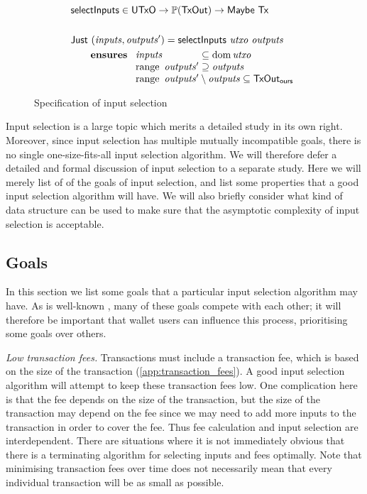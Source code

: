 \documentclass{article}
\DeclareMathOperator{\dom}{dom}
\DeclareMathOperator{\range}{range}
\theoremstyle{definition}{
  \newtheorem{lemma}{Lemma}[section] %
  \newtheorem{definition}[lemma]{Definition}
}
\theoremstyle{theorem}{
  \newtheorem{invariant}[lemma]{Invariant}
  \newtheorem{proofobligation}[lemma]{Proof Obligation}
}
\numberwithin{equation}{lemma}
\begin{document}
\begin{figure}[b]
\begin{align*}
& \mathsf{selectInputs} \in \mathsf{UTxO} \to \mathbb{P}(\mathsf{TxOut}) \to \mathsf{Maybe} ~ \mathsf{Tx} \\
\\
& \mathsf{Just} ~ (\mathit{inputs}, \mathit{outputs}') = \mathsf{selectInputs} ~ \mathit{utxo} ~ \mathit{outputs} \\
& \qquad \mathbf{ensures~}
\begin{array}[t]{l@{\;}l@{\;}l}
\mathit{inputs}          & \subseteq & \dom \mathit{utxo} \\
\range ~ \mathit{outputs}' & \supseteq & \mathit{outputs}   \\
\multicolumn{3}{l}{\range ~ \mathit{outputs}' \setminus \mathit{outputs} \subseteq \mathsf{TxOut_{ours}}} \\
\end{array}
\end{align*}
\caption{\label{fig:input_selection_sig}Specification of input selection}
\end{figure}

Input selection is a large topic which merits a detailed study in its own right.
Moreover, since input selection has multiple mutually incompatible goals, there
is no single one-size-fits-all input selection algorithm.  We will therefore
defer a detailed and formal discussion of input selection to a separate study.
Here we will merely list of of the goals of input selection, and list some
properties that a good input selection algorithm will have. We will also
briefly consider what kind of data structure can be used to make sure that
the asymptotic complexity of input selection is acceptable.

\subsection{Goals}

In this section we list some goals that a particular input selection algorithm
may have. As is well-known \citep{lopp:challenges}, many of these goals compete
with each other; it will therefore be important that wallet users can influence
this process, prioritising some goals over others.

\emph{Low transaction fees.}
Transactions must include a transaction fee, which is based on the size of the
transaction (\cref{app:transaction_fees}). A good input selection
algorithm will attempt to keep these transaction fees low. One complication here
is that the fee depends on the size of the transaction, but the size of
the transaction may depend on the fee since we may need to add more inputs to
the transaction in order to cover the fee. Thus fee calculation and input
selection are interdependent. There are situations where it is not immediately
obvious that there is a terminating algorithm for selecting inputs and fees
optimally. Note that minimising transaction fees over time does not necessarily
mean that every individual transaction will be as small as possible.
\end{document}
